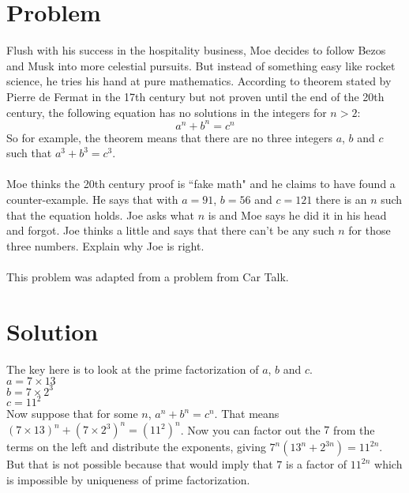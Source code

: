 \documentclass[11pt,a4paper]{report}
\theoremstyle{plain}
\theoremstyle{definition}
\theoremstyle{remark}
\begin{document}
\section*{Problem}
Flush with his success in the hospitality business, Moe decides to follow Bezos and Musk into more celestial pursuits.  But instead of something easy like rocket science, he tries his hand at pure mathematics.  According to theorem stated by Pierre de Fermat in the 17th century but not proven until the end of the 20th century, the following equation has no solutions in the integers for $n>2$:
$$a^n + b^n = c^n$$
So for example, the theorem means that there  are no three integers $a$, $b$ and $c$ such that $a^3 + b^3 = c^3.$
\\\\
Moe thinks the 20th century proof is ``fake math" and he claims to have found a counter-example.  He says that with $a = 91$, $b=56$ and $c=121$ there is an $n$ such that the equation holds.  Joe asks what $n$ is and Moe says he did it in his head and forgot.  Joe thinks a little and says that there can't be any such $n$ for those three numbers.  Explain why Joe is right.
\\\\
This problem was adapted from a problem from Car Talk.

\newpage
\section*{Solution}
The key here is to look at the prime factorization of $a$, $b$ and $c$.
\\
$a = 7 \times 13$
\\
$b = 7 \times 2^3$
\\
$c = 11^2$
\\
Now suppose that for some $n$, $a^n + b^n = c^n$.  That means  \\ $(7  \times 13)^n + (7 \times2^3)^n = (11^2)^n$.  Now you can factor out the $7$ from the terms on the left and distribute the exponents, giving $7^n(13^n + 2^{3n}) = 11^{2n}$.  But that is not possible because that would imply that $7$ is a factor of $11^{2n}$ which is impossible by uniqueness of prime factorization.
 
\end{document}
